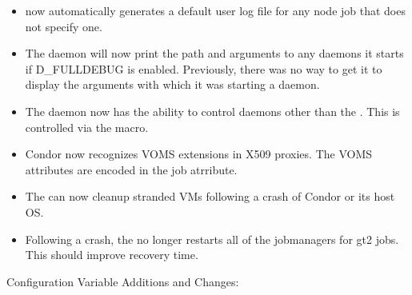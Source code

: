\begin{itemize}
\item {} now automatically generates a default user log
file for any node job that does not specify one.

\item The  daemon will now print the path and arguments
  to any daemons it starts if D\_FULLDEBUG is enabled.  Previously,
  there was no way to get it to display the arguments with which it
  was starting a daemon.

\item The  daemon now has the ability to control daemons
  other than the .  This is controlled via the
   macro.

\item Condor now recognizes VOMS extensions in X509 proxies. The VOMS
attributes are encoded in the  job
atrribute.

\item The  can now cleanup stranded VMs following a
crash of Condor or its host OS.

\item Following a crash, the  no longer restarts all
of the jobmanagers for gt2 jobs. This should improve recovery time.

\end{itemize}

\noindent Configuration Variable Additions and Changes:

